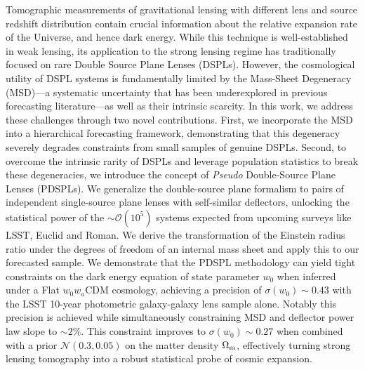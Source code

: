 Tomographic measurements of gravitational lensing with different lens and source redshift distribution contain crucial information about the relative expansion rate of the Universe, and hence dark energy.
%
While this technique is well-established in weak lensing, its application to the strong lensing regime has traditionally focused on rare Double Source Plane Lenses (DSPLs). However, the cosmological utility of DSPL systems is fundamentally limited by the Mass-Sheet Degeneracy (MSD)—a systematic uncertainty that has been underexplored in previous forecasting literature—as well as their intrinsic scarcity.
%
In this work, we address these challenges through two novel contributions. First, we incorporate the MSD into a hierarchical forecasting framework, demonstrating that this degeneracy severely degrades constraints from small samples of genuine DSPLs.
%
Second, to overcome the intrinsic rarity of DSPLs and leverage population statistics to break these degeneracies, we introduce the concept of \emph{Pseudo} Double-Source Plane Lenses (PDSPLs). We generalize the double-source plane formalism to pairs of independent single-source plane lenses with self-similar deflectors, unlocking the statistical power of the $\sim\mathcal{O}(10^5)$ systems expected from upcoming surveys like LSST, Euclid and Roman.
%
We derive the transformation of the Einstein radius ratio under the degrees of freedom of an internal mass sheet and apply this to our forecasted sample. We demonstrate that the PDSPL methodology can yield tight constraints on the dark energy equation of state parameter $w_0$ when inferred under a Flat $w_0w_a$CDM cosmology, achieving a precision of $\sigma(w_0) \sim 0.43$ with the LSST 10-year photometric galaxy-galaxy lens sample alone. Notably this precision is achieved while simultaneously constraining MSD and deflector power law slope to $\sim2\%$. This constraint improves to $\sigma(w_0) \sim 0.27$ when combined with a prior $\mathcal{N}(0.3, 0.05)$ on the matter density $\Omega_{\rm m}$, effectively turning strong lensing tomography into a robust statistical probe of cosmic expansion.
%
